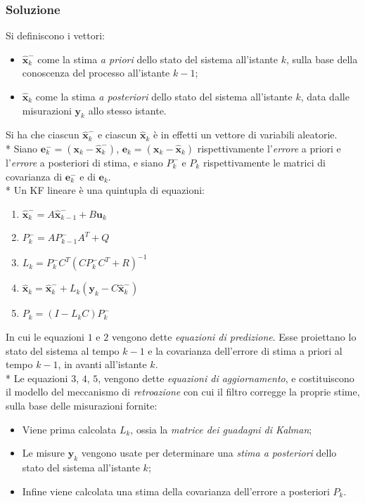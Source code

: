 \subsubsection{Soluzione}
Si definiscono i vettori:
\begin{itemize} 
	\item $\hat{\mathbf{x}}^-_k$ come la stima \emph{a priori} dello stato del sistema all'istante $k$, sulla base della conoscenza del processo all'istante $k-1$;
	\item $\hat{\mathbf{x}}_k$ come la stima \emph{a posteriori} dello stato del sistema all'istante $k$, data dalle misurazioni $\mathbf y_k$ allo stesso istante.
\end{itemize}
Si ha che ciascun $\hat{\mathbf{x}}^-_k$ e ciascun $\hat{\mathbf{x}}_k$ \`e in effetti un vettore di variabili aleatorie.\\*
Siano $\mathbf{e}^-_k = (\mathbf x_ k - \hat{\mathbf{x}}^-_k)$, $\mathbf e_k = (\mathbf x_k - \hat{\mathbf{x}}_k)$ rispettivamente l'\emph{errore} a priori e l'\emph{errore} a posteriori di stima, e siano $P^-_k$ e $P_k$ rispettivamente le matrici di covarianza di $\mathbf{e}^-_k$ e di $\mathbf{e}_k$.\\*
Un KF lineare \`e una quintupla di equazioni:
\begin{enumerate}
\item $
\hat{\mathbf{x}}^-_k = A \hat{\mathbf{x}}^-_{k-1} + B \mathbf u_k
$
\item $ P^-_k = A P^-_{k-1} A^T + Q
$
\item $ L_k = P_k^-C^T(CP_k^-C^T + R)^{-1}
$
\item $ \hat{\mathbf{x}}_k = \hat{\mathbf{x}}^-_k + L_k(\mathbf y_k - C \hat{\mathbf{x}}^-_k)
$
\item $ P_k = (I-L_kC)P^-_k
$
\end{enumerate}
In cui le equazioni $1$ e $2$ vengono dette \emph{equazioni di predizione}. Esse proiettano lo stato del sistema al tempo $k-1$ e la covarianza
dell'errore di stima a priori al tempo $k-1$, in avanti all'istante $k$.\\*
Le equazioni $3$, $4$, $5$, vengono dette \emph{equazioni di aggiornamento}, e costituiscono il modello del meccanismo di \emph{retroazione} con cui il filtro corregge la proprie stime, sulla base delle misurazioni fornite:
\begin{itemize}
	\item Viene prima calcolata $L_k$, ossia la \emph{matrice dei guadagni di Kalman};
	\item Le misure $\mathbf y_k$ vengono usate per determinare una \emph{stima a posteriori} dello stato del sistema all'istante $k$;
	\item Infine viene calcolata una stima della covarianza dell'errore a posteriori $P_k$.
\end{itemize}
